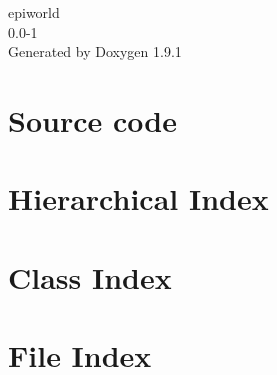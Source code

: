 \let\mypdfximage\pdfximage\def\pdfximage{\immediate\mypdfximage}\documentclass[twoside]{book}
\newcommand{\+}{\discretionary{\mbox{\scriptsize$\hookleftarrow$}}{}{}}
\newcommand{\clearemptydoublepage}{%
  \newpage{\pagestyle{empty}\cleardoublepage}%
}
\begin{document}
\raggedbottom

\hypersetup{pageanchor=false,
             bookmarksnumbered=true,
             pdfencoding=unicode
            }
\begin{titlepage}
\vspace*{7cm}
\begin{center}%
{\Large epiworld \\[1ex]\large 0.\+0-\/1 }\\
\vspace*{1cm}
{\large Generated by Doxygen 1.9.1}\\
\end{center}
\end{titlepage}
\clearemptydoublepage
{}
\tableofcontents
\clearemptydoublepage
{}
\hypersetup{pageanchor=true}

\chapter{Source code}
\label{index}\hypertarget{index}{}
\chapter{Hierarchical Index}

\chapter{Class Index}

\chapter{File Index}

\end{document}
